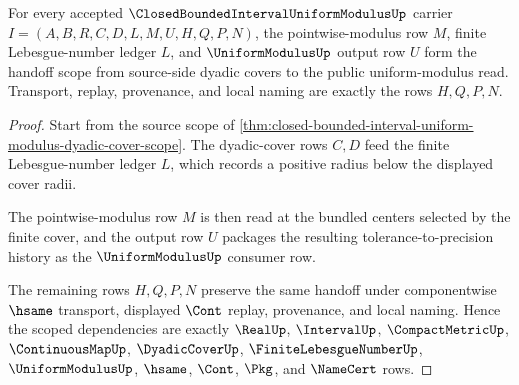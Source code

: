 \begin{theorem}
\label{thm:closed-bounded-interval-uniform-modulus-lebesgue-handoff-scope}
For every accepted $\ClosedBoundedIntervalUniformModulusUp$ carrier $I=(A,B,R,C,D,L,M,U,H,Q,P,N)$, the pointwise-modulus row $M$, finite Lebesgue-number ledger $L$, and $\UniformModulusUp$ output row $U$ form the handoff scope from source-side dyadic covers to the public uniform-modulus read. Transport, replay, provenance, and local naming are exactly the rows $H,Q,P,N$.
\end{theorem}
\begin{proof}
Start from the source scope of \autoref{thm:closed-bounded-interval-uniform-modulus-dyadic-cover-scope}. The dyadic-cover rows $C,D$ feed the finite Lebesgue-number ledger $L$, which records a positive radius below the displayed cover radii.

The pointwise-modulus row $M$ is then read at the bundled centers selected by the finite cover, and the output row $U$ packages the resulting tolerance-to-precision history as the $\UniformModulusUp$ consumer row.

The remaining rows $H,Q,P,N$ preserve the same handoff under componentwise $\hsame$ transport, displayed $\Cont$ replay, provenance, and local naming. Hence the scoped dependencies are exactly $\RealUp$, $\IntervalUp$, $\CompactMetricUp$, $\ContinuousMapUp$, $\DyadicCoverUp$, $\FiniteLebesgueNumberUp$, $\UniformModulusUp$, $\hsame$, $\Cont$, $\Pkg$, and $\NameCert$ rows.
\end{proof}


